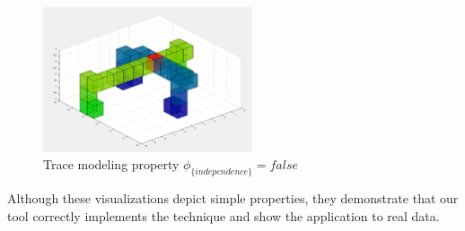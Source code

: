 \begin{figure}
  \centering
  \includegraphics[width=0.55\textwidth]{./figures/independence.png}
  \caption{Trace modeling property $\phi_{\{independence\}} = false$}
    \label{fig:independence}
\end{figure}

Although these visualizations depict simple properties, they demonstrate that our tool correctly implements the technique and show the application to real data.

